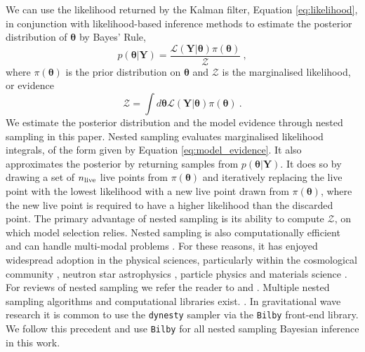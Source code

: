 \documentclass[fleqn,usenatbib,useAMS]{mnras}
\begin{document}
We can use the likelihood returned by the Kalman filter, Equation \eqref{eq:likelihood}, in conjunction with likelihood-based inference methods to estimate the posterior distribution of $\boldsymbol{\theta}$ by Bayes' Rule,
\begin{equation}
	p(\boldsymbol{\theta} | \boldsymbol{Y}) = \frac{\mathcal{L}(\boldsymbol{Y} | \boldsymbol{\theta}) \pi(\boldsymbol{\theta})}{\mathcal{Z}} \ ,
\end{equation}
where $\pi(\boldsymbol{\theta})$ is the prior distribution on $\boldsymbol{\theta}$ and $\mathcal{Z}$ is the marginalised likelihood, or evidence
\begin{equation}
	\mathcal{Z} = \int d \boldsymbol{\theta} \mathcal{L}(\boldsymbol{Y} | \boldsymbol{\theta})  \pi(\boldsymbol{\theta})  \ . \label{eq:model_evidence}
\end{equation}
We estimate the posterior distribution and the model evidence through nested sampling \citep{Skilling} in this paper. Nested sampling evaluates marginalised likelihood integrals, of the form given by Equation \eqref{eq:model_evidence}. It also approximates the posterior by returning samples from $p(\boldsymbol{\theta} | \boldsymbol{Y})$. It does so by drawing a set of $n_{\rm live}$ live points from $\pi(\boldsymbol{\theta})$ and iteratively replacing the live point with the lowest likelihood with a new live point drawn from $\pi(\boldsymbol{\theta})$, where the new live point is required to have a higher likelihood than the discarded point. The primary advantage of nested sampling is its ability to compute $\mathcal{Z}$, on which model selection relies. Nested sampling is also computationally efficient and can handle multi-modal problems \citep{Ashton2022}. For these reasons, it has enjoyed widespread adoption in the physical sciences, particularly within the cosmological community \citep{Mukherjee2006,Feroz2008,Handley2015}, neutron star astrophysics \citep{Myers2021MNRAS.502.3113M,Meyers2021,Melatos2023}, particle physics \citep{proceedings2019033014} and materials science \citep{2009arXiv0906materials}. For reviews of nested sampling we refer the reader to \cite{Buchner2021} and \cite{Ashton2022}. Multiple nested sampling algorithms and computational libraries exist. \citep[e.g.][]{Feroz2008,Feroz2009,Handley2015,dynesty2020,UltraNest2021}. In gravitational wave research it is common to use the \texttt{dynesty} sampler \citep{dynesty2020} via the \texttt{Bilby} \citep{bilby.507.2037A} front-end library. We follow this precedent and use \texttt{Bilby} for all nested sampling Bayesian inference in this work. \newline 
\end{document}
